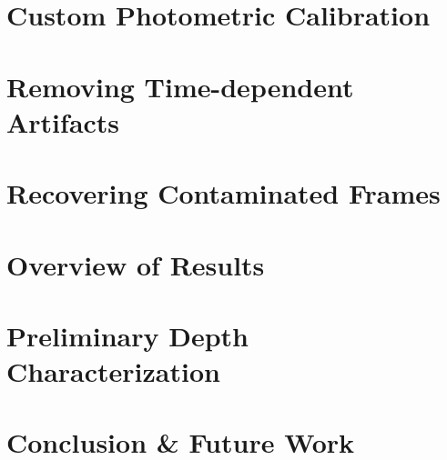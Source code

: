 \documentclass{emulateapj}
\begin{document}

\section{Custom Photometric Calibration}
\label{sec:calib}


\section{Removing Time-dependent Artifacts}
\label{sec:moon}

\section{Recovering Contaminated Frames}
\label{sec:recover}

\section{Overview of Results}
\label{sec:results}

\section{Preliminary Depth Characterization}
\label{sec:depth}

\section{Conclusion \& Future Work}
\label{sec:future}







\end{document}
